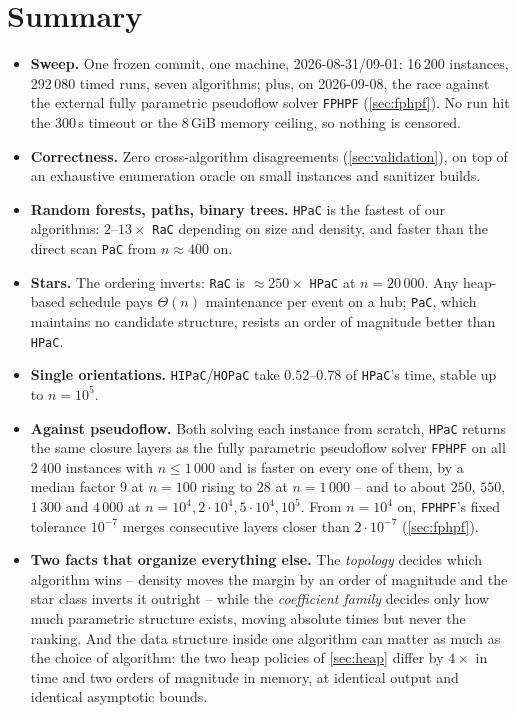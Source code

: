 \documentclass[11pt]{article}
\begin{document}
\tableofcontents
\vspace{4mm}

\section{Summary}

\begin{itemize}
  \item \textbf{Sweep.} One frozen commit, one machine, 2026-08-31/09-01:
  16\,200 instances, 292\,080 timed runs, seven algorithms; plus, on
  2026-09-08, the race against the external fully parametric pseudoflow solver
  \texttt{FPHPF} (\cref{sec:fphpf}). No run hit the 300\,s timeout or the 8\,GiB memory
  ceiling, so nothing is censored.
  \item \textbf{Correctness.} Zero cross-algorithm disagreements
  (\cref{sec:validation}), on top of an exhaustive enumeration oracle on small
  instances and sanitizer builds.
  \item \textbf{Random forests, paths, binary trees.} \texttt{HPaC} is the
  fastest of our algorithms: $2$--$13\times$ \texttt{RaC} depending on size and
  density, and faster than the direct scan \texttt{PaC} from $n\approx400$ on.
  \item \textbf{Stars.} The ordering inverts: \texttt{RaC} is
  $\approx250\times$ \texttt{HPaC} at $n=20\,000$. Any heap-based schedule
  pays $\Theta(n)$ maintenance per event on a hub; \texttt{PaC}, which
  maintains no candidate structure, resists an order of magnitude better than
  \texttt{HPaC}.
  \item \textbf{Single orientations.} \texttt{HIPaC}/\texttt{HOPaC} take
  $0.52$--$0.78$ of \texttt{HPaC}'s time, stable up to $n=10^5$.
  \item \textbf{Against pseudoflow.} Both solving each instance from scratch,
  \texttt{HPaC} returns the same closure layers as the fully parametric
  pseudoflow solver \texttt{FPHPF} on all 2\,400 instances with $n\le1\,000$
  and is faster on every one of them, by a median factor $9$ at $n=100$
  rising to $28$ at $n=1\,000$ -- and to about $250$, $550$, $1\,300$ and
  $4\,000$ at $n=10^4,2\cdot10^4,5\cdot10^4,10^5$. From $n=10^4$ on,
  \texttt{FPHPF}'s fixed tolerance $10^{-7}$ merges consecutive layers closer
  than $2\cdot10^{-7}$ (\cref{sec:fphpf}).
  \item \textbf{Two facts that organize everything else.} The \emph{topology}
  decides which algorithm wins -- density moves the margin by an order of
  magnitude and the star class inverts it outright -- while the
  \emph{coefficient family} decides only how much parametric structure exists,
  moving absolute times but never the ranking. And the data structure inside
  one algorithm can matter as much as the choice of algorithm: the two heap
  policies of \cref{sec:heap} differ by $4\times$ in time and two orders of
  magnitude in memory, at identical output and identical asymptotic bounds.
\end{itemize}
\end{document}
